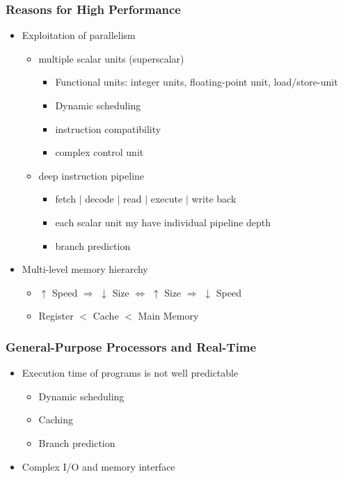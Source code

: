 \subsubsection{Reasons for High Performance}
\begin{itemize}
	\item Exploitation of parallelism
		\begin{itemize}
			\item multiple scalar units (superscalar)
				\begin{itemize}
					\item Functional units: integer units, floating-point unit, load/store-unit
					\item Dynamic scheduling
					\item instruction compatibility
					\item complex control unit 
				\end{itemize}
			\item deep instruction pipeline
				\begin{itemize}
					\item fetch $\vert$ decode $\vert$ read $\vert$ execute $\vert$ write back
					\item each scalar unit my have individual pipeline depth
					\item branch prediction 
				\end{itemize}
		\end{itemize}
	\item Multi-level memory hierarchy 
		\begin{itemize}
			\item $\uparrow$ Speed $\Rightarrow$ $\downarrow$ Size $\Leftrightarrow$ $\uparrow$ Size $\Rightarrow$ $\downarrow$ Speed
			\item Register $<$ Cache $<$ Main Memory
		\end{itemize}
\end{itemize}

\subsubsection{General-Purpose Processors and Real-Time}
\begin{itemize}
	\item Execution time of programs is not well predictable 
		\begin{itemize}
			\item Dynamic scheduling
			\item Caching
			\item Branch prediction
		\end{itemize}
	\item Complex I/O and memory interface
\end{itemize}

